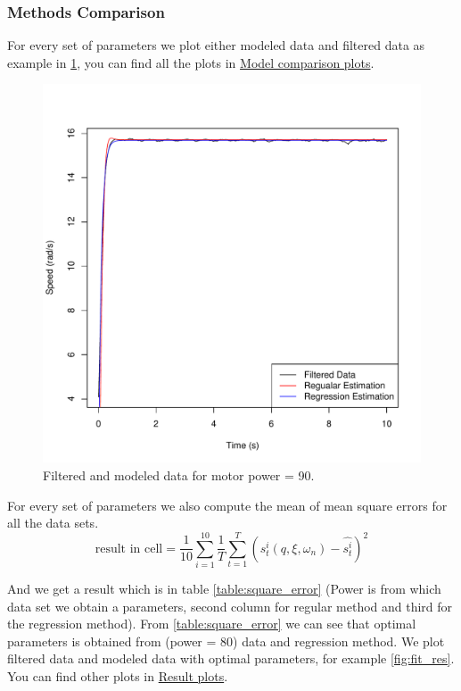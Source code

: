 \documentclass[a4paper,12pt,oneside]{article}
\begin{document}
\subsubsection {Methods Comparison}
For every set of parameters we plot either modeled data and filtered data as example in \cref{fig:fit_dual}, you can find all the plots in \href{https://github.com/AliaksandrSiarohin/AppliedRobotics/tree/master/motor_data/plots/dual_estimation}{Model comparison plots}.
\begin{figure}[t]%
	\centering
	\includegraphics[width=\columnwidth]{../motor_data/plots/dual_estimation/90}
	\caption{Filtered and modeled data for motor power = 90.}%
	\label{fig:fit_dual}%
\end{figure}
For every set of parameters we also compute the mean of mean square errors for all the data sets.
\begin{equation}
\text{result in cell} = \frac{1}{10}\sum_{i=1}^{10}\frac{1}{T}\sum_{t=1}^{T}{(s_t^i(q, \xi, \omega_{n}) - \hat{s_t^i}) ^ 2}
\end{equation}

And we get a result which is in table \cref{table:square_error} (Power is from which data set we obtain a parameters, second column for regular method and third for the regression method). From \cref{table:square_error} we can see that optimal parameters is obtained from (power = 80) data and regression method. We plot filtered data and modeled data with optimal parameters, for example \cref{fig:fit_res}. You can find other plots in \href{https://github.com/AliaksandrSiarohin/AppliedRobotics/tree/master/motor_data/plots/result_estimation}{Result plots}.
\end{document}
